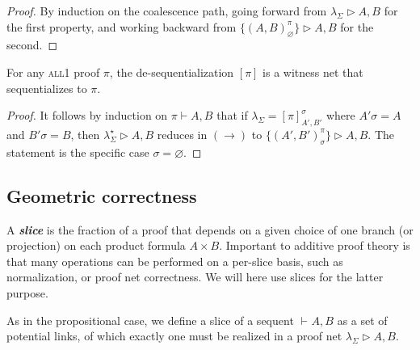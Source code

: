 \documentclass[UKenglish]{lipics-v2016}
\theoremstyle{plain}
\newcommand\defn[1]{\textit{\textbf{#1}}}
\newcommand\varE{\textsc{var}^\exists}
\newcommand\terms{\textsc{term}}
\newcommand\all{\textsc{all}}
\newcommand\poss[1]{\textsc{pos}(#1)}
\newcommand\+{+}
\renewcommand\*{\times}
\newcommand\sub{\leq}
\newcommand\seq[3][]{{\vdash_{#1}}#2,#3}
\newcommand\prf[3]{#1\vdash\!#2,#3}
\newcommand\net[3]{#1\triangleright #2,#3}
\newcommand\link[3][\sigma]{(#2,#3)_{#1}}
\newcommand\scoal{\rightarrow} %
\begin{document}
\begin{proof}
By induction on the coalescence path, going forward from $\net{\lambda_\Sigma}AB$ for the first property, and working backward from $\net{\{\link[\varnothing]AB^\pi\}}AB$ for the second.
\end{proof}


\begin{theorem}
For any \all1 proof $\pi$, the de-sequentialization $[\pi]$ is a witness net that sequentializes to $\pi$. 
\end{theorem}

\begin{proof}
It follows by induction on $\prf\pi AB$ that if $\lambda_\Sigma=[\pi]_{A',B'}^\sigma$ where $A'\sigma=A$ and $B'\sigma=B$, then $\net{\lambda^\star_\Sigma}AB$ reduces in $(\scoal)$ to $\net{\{\link{A'}{B'}^\pi\}}AB$. The statement is the specific case $\sigma=\varnothing$.
\end{proof}



\subsection{Geometric correctness}


A \defn{slice} is the fraction of a proof that depends on a given choice of one branch (or projection) on each product formula $A\*B$. Important to additive proof theory is that many operations can be performed on a per-slice basis, such as normalization, or proof net correctness. We will here use slices for the latter purpose.

As in the propositional case, we define a slice of a sequent $\seq AB$ as a set of potential links, of which exactly one must be realized in a proof net $\net{\lambda_\Sigma}AB$.


\end{document}
